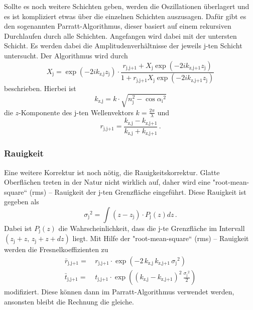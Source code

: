 Sollte es noch weitere Schichten geben, werden die Oszillationen überlagert und es ist kompliziert etwas über die einzelnen Schichten auszusagen.
Dafür gibt es den sogenannten Parratt-Algorithmus, dieser basiert auf einem rekursiven Durchlaufen durch alle Schichten.
Angefangen wird dabei mit der untersten Schicht.
Es werden dabei die Amplitudenverhältnisse der jeweils j-ten Schicht untersucht.
Der Algorithmus wird durch 
\begin{equation}
    X_\text{j} =  \exp(-2 i k_\text{z,j} z_\text{j}) \cdot  \frac{r_\text{j,j+1} + X_\text{j} \exp(-2 i k_\text{z,j+1} z_\text{j})}
    {1 + r_\text{j,j+1} X_\text{j} \exp(-2 i k_\text{z,j+1} z_\text{j})}
    \label{eq:parratt}
\end{equation}
beschrieben.
Hierbei ist 
\begin{equation}
    k_\text{z,j} = k \cdot \sqrt{n_\text{j}^2 -  {\cos{\alpha _\text{i}}}^2}
    \label{eq:k}
\end{equation}
die $z$-Komponente des j-ten Wellenvektors $k = \frac{2 \pi}{\lambda}$ und 
\begin{equation}
    r_\text{j,j+1} = \frac{k_\text{z,j} - k_\text{z,j+1}}{k_\text{z,j} + k_\text{z,j+1}} \,.
    \label{eq:r}
\end{equation}

\subsubsection{Rauigkeit}

Eine weitere Korrektur ist noch nötig, die Rauigkeitskorrektur. 
Glatte Oberflächen treten in der Natur nicht wirklich auf, daher wird eine "root-mean-square“ (rms) – Rauigkeit der j-ten Grenzfläche eingeführt.
Diese Rauigkeit ist gegeben als 
\begin{equation}
    {\sigma _\text{j}}^2 = \int \left( z - z_\text{j} \right) \cdot P_\text{j}(z) dz  \,.
    \label{eq:rms}
\end{equation}
Dabei ist $P_\text{j}(z)$ die Wahrscheinlichkeit, dass die j-te Grenzfläche im Intervall $\left(z_\text{j} + z,\, z_\text{j} + z + dz  \right) $ liegt.
Mit Hilfe der "root-mean-square“ (rms) – Rauigkeit werden die Fresnelkoeffizienten zu 
\begin{align}
    \bar{r} _\text{j,j+1} =& \, r_\text{j,j+1} \cdot \exp\left(  - 2 \, k_\text{z,j} \,  k_\text{z,j+1} \, {\sigma _\text{j}}^2  \right) 
    \label{eq:r_modifiziert} \\
    \bar{t} _\text{j,j+1} =& \, t_\text{j,j+1} \cdot \exp\left(  (k_\text{z,j} - k_\text{z,j+1})^2 \, \frac{{\sigma _\text{j}}^2}{2}  \right)
    \label{eq:t_modifiziert}
\end{align}
modifiziert.
Diese können dann im Parratt-Algorithmus verwendet werden, ansonsten bleibt die Rechnung die gleiche.


